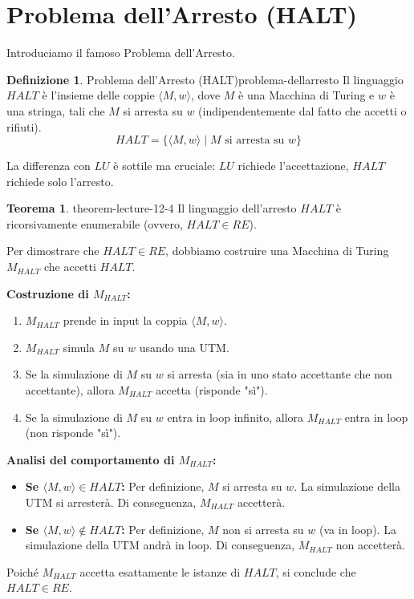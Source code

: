 \documentclass[a4paper]{article}
\makeatletter
\theoremstyle{definition} %
\newtheorem{theorem}{Teorema}
[section] %
\newtheorem{definition}{Definizione}[section] %
\renewenvironment{proof}[1][\proofname]{\par
  \pushQED{\qed}%
  \normalfont \topsep6\p@\@plus6\p@\relax
  \trivlist
  \item[\hskip\labelsep
        \bfseries
    #1\@addpunct{.}]\ignorespaces
}{%
  \popQED\endtrivlist\@endpefalse
}
\makeatother
\begin{document}
\section{Problema dell'Arresto (HALT)}
Introduciamo il famoso Problema dell'Arresto.
\begin{definition}{Problema dell'Arresto (HALT)}{problema-dellarresto}
Il linguaggio $HALT$ è l'insieme delle coppie $\langle M, w \rangle$, dove $M$ è una Macchina di Turing e $w$ è una stringa, tali che $M$ si arresta su $w$ (indipendentemente dal fatto che accetti o rifiuti).
\[ HALT = \{ \langle M, w \rangle \mid M \text{ si arresta su } w \} \]
\end{definition}
La differenza con $LU$ è sottile ma cruciale: $LU$ richiede l'accettazione, $HALT$ richiede solo l'arresto.

\begin{theorem}{}{{ theorem-lecture-12-4 }}
Il linguaggio dell'arresto $HALT$ è ricorsivamente enumerabile (ovvero, $HALT \in RE$).
\end{theorem}
\begin{proof}
Per dimostrare che $HALT \in RE$, dobbiamo costruire una Macchina di Turing $M_{HALT}$ che accetti $HALT$.

\textbf{Costruzione di $M_{HALT}$:}
\begin{enumerate}
    \item $M_{HALT}$ prende in input la coppia $\langle M, w \rangle$.
    \item $M_{HALT}$ simula $M$ su $w$ usando una UTM.
    \item Se la simulazione di $M$ su $w$ si arresta (sia in uno stato accettante che non accettante), allora $M_{HALT}$ accetta (risponde "sì").
    \item Se la simulazione di $M$ su $w$ entra in loop infinito, allora $M_{HALT}$ entra in loop (non risponde "sì").
\end{enumerate}
\textbf{Analisi del comportamento di $M_{HALT}$:}
\begin{itemize}
    \item \textbf{Se $\langle M, w \rangle \in HALT$:}
    Per definizione, $M$ si arresta su $w$. La simulazione della UTM si arresterà. Di conseguenza, $M_{HALT}$ accetterà.
    \item \textbf{Se $\langle M, w \rangle \notin HALT$:}
    Per definizione, $M$ non si arresta su $w$ (va in loop). La simulazione della UTM andrà in loop. Di conseguenza, $M_{HALT}$ non accetterà.
\end{itemize}
Poiché $M_{HALT}$ accetta esattamente le istanze di $HALT$, si conclude che $HALT \in RE$.
\end{proof}
\end{document}
